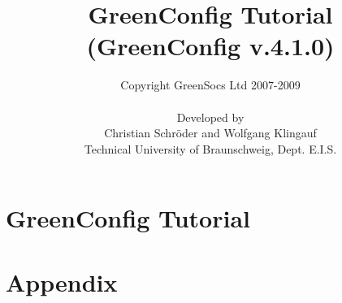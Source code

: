 \documentclass[a4paper,12pt,oneside]{gsbook}
\author{Copyright GreenSocs Ltd 2007-2009\\ \\Developed by\\Christian Schr\"oder and Wolfgang Klingauf\\Technical University of Braunschweig, Dept. E.I.S.}
\title{GreenConfig Tutorial\\(GreenConfig v.4.1.0)}
\begin{document}
\maketitle

\tableofcontents
\enlargethispage{\baselineskip}

\chapter{GreenConfig Tutorial}





\appendix

	\chapter{Appendix}

	
\end{document}
